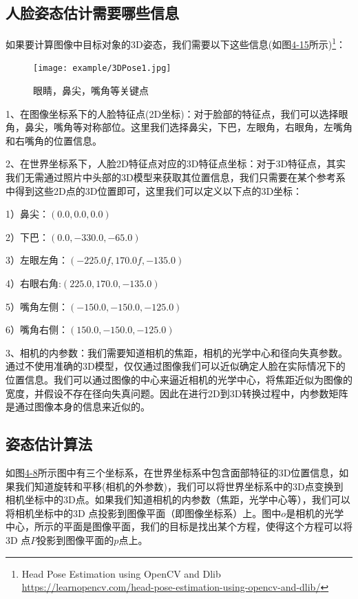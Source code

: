 \subsection{人脸姿态估计需要哪些信息}

如果要计算图像中目标对象的3D姿态，我们需要以下这些信息(如图\href{fig:4-15}{4-15}所示)\footnote{Head Pose Estimation using OpenCV and Dlib \quad \url{https://learnopencv.com/head-pose-estimation-using-opencv-and-dlib/}}：

\begin{figure}[!htp]
\centering
\texttt{[image: example/3DPose1.jpg]}
\caption{眼睛，鼻尖，嘴角等关键点}
\label{fig1:4-15}
\end{figure}

1、在图像坐标系下的人脸特征点(2D坐标)：对于脸部的特征点，我们可以选择眼角，鼻尖，嘴角等对称部位。这里我们选择鼻尖，下巴，左眼角，右眼角，左嘴角和右嘴角的位置信息。

2、在世界坐标系下，人脸2D特征点对应的3D特征点坐标：对于3D特征点，其实我们无需通过照片中头部的3D模型来获取其位置信息，我们只需要在某个参考系中得到这些2D点的3D位置即可，这里我们可以定义以下点的3D坐标：

1）鼻尖：$(0.0,0.0,0.0)$

2）下巴：$(0.0,-330.0,-65.0)$

3）左眼左角：$(-225.0f,170.0f,-135.0)$

4）右眼右角:$(225.0,170.0,-135.0)$

5）嘴角左侧：$(-150.0,-150.0,-125.0)$

6）嘴角右侧：$(150.0,-150.0,-125.0)$

3、相机的内参数：我们需要知道相机的焦距，相机的光学中心和径向失真参数。通过不使用准确的3D模型，仅仅通过图像我们可以近似确定人脸在实际情况下的位置信息。我们可以通过图像的中心来逼近相机的光学中心，将焦距近似为图像的宽度，并假设不存在径向失真问题。因此在进行2D到3D转换过程中，内参数矩阵是通过图像本身的信息来近似的。

\subsection{姿态估计算法}

如图\href{fig:4-8}{4-8}所示图中有三个坐标系，在世界坐标系中包含面部特征的3D位置信息，如果我们知道旋转和平移(相机的外参数)，我们可以将世界坐标系中的3D点变换到相机坐标中的3D点。如果我们知道相机的内参数（焦距，光学中心等），我们可以将相机坐标中的3D 点投影到图像平面（即图像坐标系）上。图中$o$是相机的光学中心，所示的平面是图像平面，我们的目标是找出某个方程，使得这个方程可以将3D 点$P$投影到图像平面的$p$点上。

